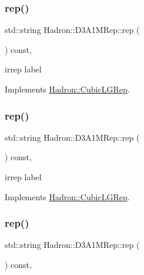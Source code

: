 \subsubsection{\texorpdfstring{rep()}{rep()}\hspace{0.1cm}{\footnotesize\ttfamily [1/3]}}
{\footnotesize\ttfamily std\+::string Hadron\+::\+D3\+A1\+M\+Rep\+::rep (\begin{DoxyParamCaption}{ }\end{DoxyParamCaption}) const\hspace{0.3cm}{\ttfamily [inline]}, {\ttfamily [virtual]}}

irrep label 

Implements \mbox{\hyperlink{structHadron_1_1CubicLGRep_a50f5ddbb8f4be4cee0106fa9e8c75e6c}{Hadron\+::\+Cubic\+L\+G\+Rep}}.

\mbox{\label{structHadron_1_1D3A1MRep_ac976defff42a8379442ad25c629172c3}} 
\subsubsection{\texorpdfstring{rep()}{rep()}\hspace{0.1cm}{\footnotesize\ttfamily [2/3]}}
{\footnotesize\ttfamily std\+::string Hadron\+::\+D3\+A1\+M\+Rep\+::rep (\begin{DoxyParamCaption}{ }\end{DoxyParamCaption}) const\hspace{0.3cm}{\ttfamily [inline]}, {\ttfamily [virtual]}}

irrep label 

Implements \mbox{\hyperlink{structHadron_1_1CubicLGRep_a50f5ddbb8f4be4cee0106fa9e8c75e6c}{Hadron\+::\+Cubic\+L\+G\+Rep}}.

\mbox{\label{structHadron_1_1D3A1MRep_ac976defff42a8379442ad25c629172c3}} 
\subsubsection{\texorpdfstring{rep()}{rep()}\hspace{0.1cm}{\footnotesize\ttfamily [3/3]}}
{\footnotesize\ttfamily std\+::string Hadron\+::\+D3\+A1\+M\+Rep\+::rep (\begin{DoxyParamCaption}{ }\end{DoxyParamCaption}) const\hspace{0.3cm}{\ttfamily [inline]}, {\ttfamily [virtual]}}

